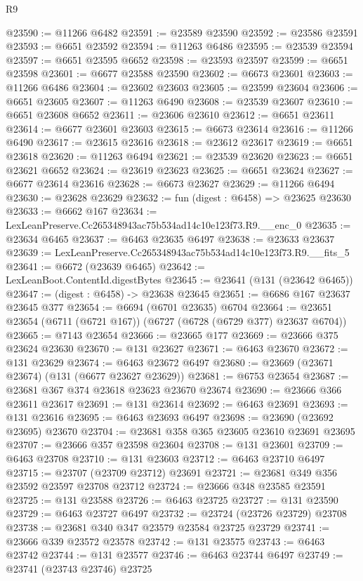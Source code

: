 \begin{lexlean}{R9}
\begin{coremodule}
@23590 := @11266 @6482
@23591 := @23589 @23590
@23592 := @23586 @23591
@23593 := @6651 @23592
@23594 := @11263 @6486
@23595 := @23539 @23594
@23597 := @6651 @23595 @6652
@23598 := @23593 @23597
@23599 := @6651 @23598
@23601 := @6677 @23588 @23590
@23602 := @6673 @23601
@23603 := @11266 @6486
@23604 := @23602 @23603
@23605 := @23599 @23604
@23606 := @6651 @23605
@23607 := @11263 @6490
@23608 := @23539 @23607
@23610 := @6651 @23608 @6652
@23611 := @23606 @23610
@23612 := @6651 @23611
@23614 := @6677 @23601 @23603
@23615 := @6673 @23614
@23616 := @11266 @6490
@23617 := @23615 @23616
@23618 := @23612 @23617
@23619 := @6651 @23618
@23620 := @11263 @6494
@23621 := @23539 @23620
@23623 := @6651 @23621 @6652
@23624 := @23619 @23623
@23625 := @6651 @23624
@23627 := @6677 @23614 @23616
@23628 := @6673 @23627
@23629 := @11266 @6494
@23630 := @23628 @23629
@23632 := fun (digest : @6458) => @23625 @23630
@23633 := @6662 @167
@23634 := LexLeanPreserve.Cc265348943ac75b534ad14c10e123f73.R9.__enc_0
@23635 := @23634 @6465
@23637 := @6463 @23635 @6497
@23638 := @23633 @23637
@23639 := LexLeanPreserve.Cc265348943ac75b534ad14c10e123f73.R9.__fits_5
@23641 := @6672 (@23639 @6465)
@23642 := LexLeanBoot.ContentId.digestBytes
@23645 := @23641 (@131 (@23642 @6465))
@23647 := (digest : @6458) -> @23638 @23645
@23651 := @6686 @167 @23637 @23645 @377
@23654 := @6694 (@6701 @23635) @6704
@23664 := @23651 @23654 (@6711 (@6721 @167)) (@6727 (@6728 (@6729 @377) @23637 @6704))
@23665 := @7143 @23654
@23666 := @23665 @177
@23669 := @23666 @375 @23624 @23630
@23670 := @131 @23627
@23671 := @6463 @23670
@23672 := @131 @23629
@23674 := @6463 @23672 @6497
@23680 := @23669 (@23671 @23674) (@131 (@6677 @23627 @23629))
@23681 := @6753 @23654
@23687 := @23681 @367 @374 @23618 @23623 @23670 @23674
@23690 := @23666 @366 @23611 @23617
@23691 := @131 @23614
@23692 := @6463 @23691
@23693 := @131 @23616
@23695 := @6463 @23693 @6497
@23698 := @23690 (@23692 @23695) @23670
@23704 := @23681 @358 @365 @23605 @23610 @23691 @23695
@23707 := @23666 @357 @23598 @23604
@23708 := @131 @23601
@23709 := @6463 @23708
@23710 := @131 @23603
@23712 := @6463 @23710 @6497
@23715 := @23707 (@23709 @23712) @23691
@23721 := @23681 @349 @356 @23592 @23597 @23708 @23712
@23724 := @23666 @348 @23585 @23591
@23725 := @131 @23588
@23726 := @6463 @23725
@23727 := @131 @23590
@23729 := @6463 @23727 @6497
@23732 := @23724 (@23726 @23729) @23708
@23738 := @23681 @340 @347 @23579 @23584 @23725 @23729
@23741 := @23666 @339 @23572 @23578
@23742 := @131 @23575
@23743 := @6463 @23742
@23744 := @131 @23577
@23746 := @6463 @23744 @6497
@23749 := @23741 (@23743 @23746) @23725

\end{coremodule}
\end{lexlean}
